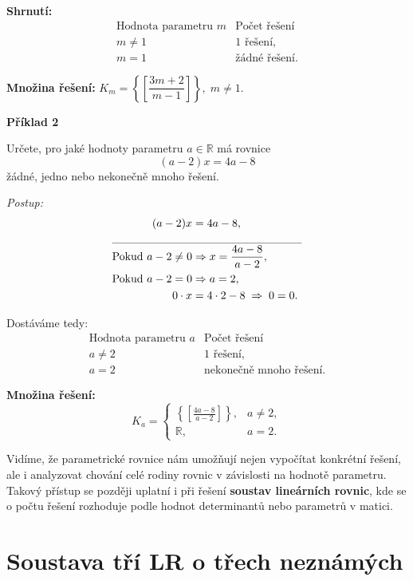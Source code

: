 \documentclass[12pt,a4paper]{article}
\begin{document}
\textbf{Shrnutí:}
\[
\begin{array}{l|l}
\text{Hodnota parametru } m & \text{Počet řešení}\\
\hline
m \neq 1 & 1 \text{ řešení},\\
m = 1 & \text{žádné řešení.}
\end{array}
\]

\textbf{Množina řešení:} \quad
\(K_m = \left\{\left[\dfrac{3m+2}{m-1}\right]\right\}, \; m \neq 1.\)


\begin{examplebox}
\textbf{Příklad 2}

Určete, pro jaké hodnoty parametru \(a \in \mathbb{R}\) má rovnice
\[
(a - 2)x = 4a - 8
\]
žádné, jedno nebo nekonečně mnoho řešení.

\textit{Postup:}
\begin{align*}
(a - 2)x &= 4a - 8,\\
\multicolumn{2}{c}{\rule{6cm}{0.3pt}}\\[-2pt]
\text{Pokud } a - 2 \neq 0 &\Rightarrow x = \dfrac{4a - 8}{a - 2},\\
\text{Pokud } a - 2 = 0 &\Rightarrow a = 2,\\
0 \cdot x &= 4\cdot2 - 8 \;\Rightarrow\; 0 = 0.
\end{align*}

Dostáváme tedy:
\[
\begin{array}{l|l}
\text{Hodnota parametru } a & \text{Počet řešení}\\
\hline
a \neq 2 & 1 \text{ řešení},\\
a = 2 & \text{nekonečně mnoho řešení.}
\end{array}
\]

\textbf{Množina řešení:}
\[
K_a =
\begin{cases}
\displaystyle \left\{\left[\frac{4a-8}{a-2}\right]\right\}, & a \neq 2,\\[8pt]
\mathbb{R}, & a = 2.
\end{cases}
\]
\end{examplebox}


Vidíme, že parametrické rovnice nám umožňují nejen vypočítat konkrétní řešení,  
ale i analyzovat chování celé rodiny rovnic v závislosti na hodnotě parametru.  
Takový přístup se později uplatní i při řešení \textbf{soustav lineárních rovnic},  
kde se o počtu řešení rozhoduje podle hodnot determinantů nebo parametrů v matici.





\newpage
\section{Soustava tří LR o třech neznámých}
\end{document}

